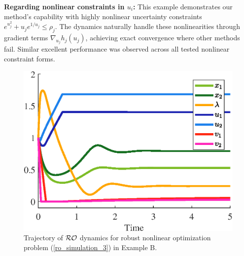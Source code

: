 \documentclass[journal,twoside,web]{ieeecolor}
\newcommand{\rev}[1]{\textcolor{revisionblue}{#1}}
\begin{document}
\rev{\textbf{Regarding nonlinear constraints in $u_i$:} This example demonstrates our method's capability with highly nonlinear uncertainty constraints $e^{u_j^2}+u_j e^{1/u_j} \leq \rho_j$. The dynamics naturally handle these nonlinearities through gradient terms $\nabla_{u_j} h_j(u_j)$, achieving exact convergence where other methods fail. Similar excellent performance was observed across all tested nonlinear constraint forms.}
\begin{figure}
\begin{center}
\includegraphics[scale=0.55]{trajectories_nonlinear_exp_no_RC.eps}
\caption{\rev{Trajectory of ${\cal RO}$ dynamics for robust nonlinear optimization problem (\ref{ro_simulation_3}) in Example B.}}
\label{trajectories_nonlinear_exp_no_RC}
\end{center}
\end{figure}
\end{document}
